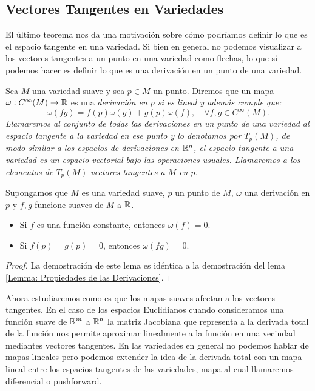 \subsection{Vectores Tangentes en Variedades}\label{Subsección: Espacios Tangentes en Variedades}
El último teorema nos da una motivación sobre cómo podríamos definir lo que es el espacio tangente en una variedad. Si bien en general no podemos visualizar a los vectores tangentes a un punto en una variedad como flechas, lo que sí podemos hacer es definir lo que es una derivación en un punto de una variedad.

\begin{definition}
	Sea $M$ una variedad suave y sea $p \in M$ un punto. Diremos que un mapa $\omega: C^{\infty}(M) \to \mathbb{R}$ es una \it{derivación} en $p$ si es lineal y además cumple que:
	\[
		\omega(fg) = f(p)\omega(g) + g(p)\omega(f), \quad \forall f,g \in C^{\infty}(M).
	\]
	Llamaremos al conjunto de todas las derivaciones en un punto de una variedad al \it{espacio tangente} a la variedad en ese punto y lo denotamos por $T_p (M)$, de modo similar a los espacios de derivaciones en $\mathbb{R}^n$, el espacio tangente a una variedad es un espacio vectorial bajo las operaciones usuales. Llamaremos a los elementos de $T_p(M)$ \it{vectores tangentes a $M$ en $p$}.
\end{definition}

\begin{lemma}\label{Lemma: Propiedades De Las Derivaciones En Variedades}
	Supongamos que $M$ es una variedad suave, $p$ un punto de $M$, $\omega$ una derivación en $p$ y $f,g$ funcione suaves de $M$ a $\mathbb{R}$.
	\begin{itemize}
		\item Si $f$ es una función constante, entonces $\omega(f) = 0$.
		\item Si $f(p) = g(p) = 0$, entonces $\omega(fg) = 0$.
	\end{itemize}
\end{lemma}

\begin{proof}
	La demostración de este lema es idéntica a la demostración del lema \ref{Lemma: Propiedades de las Derivaciones}.
\end{proof}

Ahora estudiaremos como es que los mapas suaves afectan a los vectores tangentes. En el caso de los espacios Euclidianos cuando consideramos una función suave de $\mathbb{R}^m$ a $\mathbb{R}^n$ la matriz Jacobiana que representa a la derivada total de la función nos permite aproximar linealmente a la función en una vecindad mediantes vectores tangentes. En las variedades en general no podemos hablar de mapas lineales pero podemos extender la idea de la derivada total con un mapa lineal entre los espacios tangentes de las variedades, mapa al cual llamaremos diferencial o pushforward.

